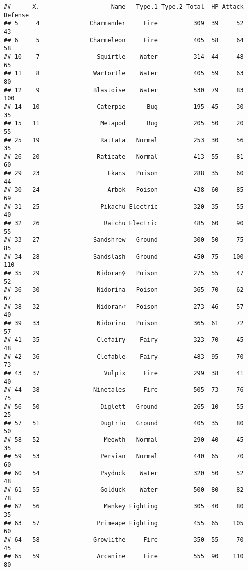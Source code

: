 \documentclass[
]{article}
\begin{document}
\begin{verbatim}
##      X.                    Name   Type.1 Type.2 Total  HP Attack Defense
## 5     4              Charmander     Fire          309  39     52      43
## 6     5              Charmeleon     Fire          405  58     64      58
## 10    7                Squirtle    Water          314  44     48      65
## 11    8               Wartortle    Water          405  59     63      80
## 12    9               Blastoise    Water          530  79     83     100
## 14   10                Caterpie      Bug          195  45     30      35
## 15   11                 Metapod      Bug          205  50     20      55
## 25   19                 Rattata   Normal          253  30     56      35
## 26   20                Raticate   Normal          413  55     81      60
## 29   23                   Ekans   Poison          288  35     60      44
## 30   24                   Arbok   Poison          438  60     85      69
## 31   25                 Pikachu Electric          320  35     55      40
## 32   26                  Raichu Electric          485  60     90      55
## 33   27               Sandshrew   Ground          300  50     75      85
## 34   28               Sandslash   Ground          450  75    100     110
## 35   29                Nidoran♀   Poison          275  55     47      52
## 36   30                Nidorina   Poison          365  70     62      67
## 38   32                Nidoran♂   Poison          273  46     57      40
## 39   33                Nidorino   Poison          365  61     72      57
## 41   35                Clefairy    Fairy          323  70     45      48
## 42   36                Clefable    Fairy          483  95     70      73
## 43   37                  Vulpix     Fire          299  38     41      40
## 44   38               Ninetales     Fire          505  73     76      75
## 56   50                 Diglett   Ground          265  10     55      25
## 57   51                 Dugtrio   Ground          405  35     80      50
## 58   52                  Meowth   Normal          290  40     45      35
## 59   53                 Persian   Normal          440  65     70      60
## 60   54                 Psyduck    Water          320  50     52      48
## 61   55                 Golduck    Water          500  80     82      78
## 62   56                  Mankey Fighting          305  40     80      35
## 63   57                Primeape Fighting          455  65    105      60
## 64   58               Growlithe     Fire          350  55     70      45
## 65   59                Arcanine     Fire          555  90    110      80

\end{verbatim}
\end{document}
